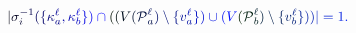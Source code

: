 \documentclass[12pt]{article}
\begin{document}
\makeatletter
\renewcommand*{\@textcolor}[3]{%
  \protect\leavevmode
  \begingroup
    \color#1{#2}#3%
  \endgroup
}
\makeatother
\begin{displaymath}
\mathcolor[RGB]{0,0,15}{|} \mathcolor[RGB]{0,0,30}{\sigma} _ { \mathcolor[RGB]{0,0,45}{i} } ^ { \mathcolor[RGB]{0,0,60}{-} \mathcolor[RGB]{0,0,75}{1} } \mathcolor[RGB]{0,0,90}{(} \mathcolor[RGB]{0,0,105}{\{} \mathcolor[RGB]{0,0,120}{\kappa} _ { \mathcolor[RGB]{0,0,135}{a} } ^ { \mathcolor[RGB]{0,0,150}{\ell} } \mathcolor[RGB]{0,0,165}{,} \mathcolor[RGB]{0,0,180}{\kappa} _ { \mathcolor[RGB]{0,0,195}{b} } ^ { \mathcolor[RGB]{0,0,210}{\ell} } \mathcolor[RGB]{0,0,225}{\}} \mathcolor[RGB]{0,0,240}{)} \mathcolor[RGB]{0,0,255}{\cap} \mathcolor[RGB]{0,15,0}{(} \mathcolor[RGB]{0,15,15}{(} \mathcolor[RGB]{0,15,30}{V} \mathcolor[RGB]{0,15,45}{(} \mathcal { \mathcolor[RGB]{0,15,60}{P} } _ { \mathcolor[RGB]{0,15,75}{a} } ^ { \mathcolor[RGB]{0,15,90}{\ell} } \mathcolor[RGB]{0,15,105}{)} \mathcolor[RGB]{0,15,120}{\setminus} \mathcolor[RGB]{0,15,135}{\{} \mathcolor[RGB]{0,15,150}{v} _ { \mathcolor[RGB]{0,15,165}{a} } ^ { \mathcolor[RGB]{0,15,180}{\ell} } \mathcolor[RGB]{0,15,195}{\}} \mathcolor[RGB]{0,15,210}{)} \mathcolor[RGB]{0,15,225}{\cup} \mathcolor[RGB]{0,15,240}{(} \mathcolor[RGB]{0,15,255}{V} \mathcolor[RGB]{0,30,0}{(} \mathcal { \mathcolor[RGB]{0,30,15}{P} } _ { \mathcolor[RGB]{0,30,30}{b} } ^ { \mathcolor[RGB]{0,30,45}{\ell} } \mathcolor[RGB]{0,30,60}{)} \mathcolor[RGB]{0,30,75}{\setminus} \mathcolor[RGB]{0,30,90}{\{} \mathcolor[RGB]{0,30,105}{v} _ { \mathcolor[RGB]{0,30,120}{b} } ^ { \mathcolor[RGB]{0,30,135}{\ell} } \mathcolor[RGB]{0,30,150}{\}} \mathcolor[RGB]{0,30,165}{)} \mathcolor[RGB]{0,30,180}{)} \mathcolor[RGB]{0,30,195}{|} \mathcolor[RGB]{0,30,210}{=} \mathcolor[RGB]{0,30,225}{1} \mathcolor[RGB]{0,30,240}{.}
\end{displaymath}
\end{document}
